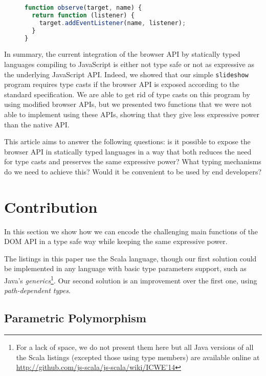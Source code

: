 \documentclass{llncs}
\newcommand{\jscode}[1]{\lstinline[language=JavaScript]|#1|}
\begin{document}
\begin{figure}
\begin{lstlisting}[label=lst-js-react,language=JavaScript,caption={Partial application of \jscode{addEventListener} parameters}]
function observe(target, name) {
  return function (listener) {
    target.addEventListener(name, listener);
  }
}
\end{lstlisting}
\end{figure}

In summary, the current integration of the browser API by statically typed languages compiling to JavaScript is either not type safe or not as expressive as the underlying JavaScript API. Indeed, we showed that our simple \jscode{slideshow} program requires type casts if the browser API is exposed according to the standard specification. We are able to get rid of type casts on this program by using modified browser APIs, but we presented two functions that we were not able to implement using these APIs, showing that they give less expressive power than the native API.

This article aims to answer the following questions: is it possible to expose the browser API in statically typed languages in a way that both reduces the need for type casts and preserves the same expressive power? What typing mechanisms do we need to achieve this? Would it be convenient to be used by end developers?

\section{Contribution}
\label{sec-contribution}

In this section we show how we can encode the challenging main functions of the DOM API in a type safe way while keeping the same expressive power.

The listings in this paper use the Scala language, though our first solution could be implemented in any language with basic type parameters support, such as Java's \emph{generics}\footnote{For a lack of space, we do not present them here but all Java versions of all the Scala listings (excepted those using type members) are available online at \href{http://github.com/js-scala/js-scala/wiki/ICWE'14}{http://github.com/js-scala/js-scala/wiki/ICWE'14}}. Our second solution is an improvement over the first one, using \emph{path-dependent types}.

\subsection{Parametric Polymorphism}
\end{document}
